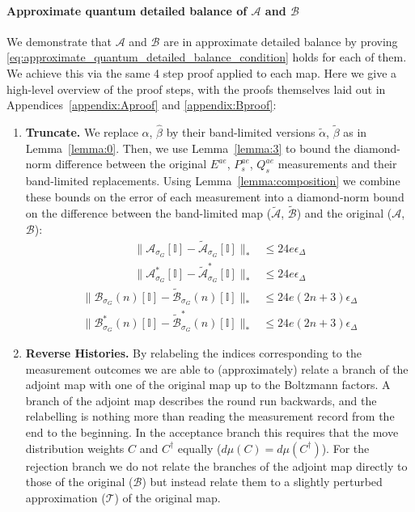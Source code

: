 \paragraph{Approximate quantum detailed balance of $\mathcal{A}$ and $\mathcal{B}$}
\label{section:proofbranchwisebalance}
We demonstrate that $\mathcal{A}$ and $\mathcal{B}$ are in approximate detailed balance by proving \eqref{eq:approximate_quantum_detailed_balance_condition} holds for each of them. We achieve this via the same 4 step proof applied to each map. Here we give a high-level overview of the proof steps, with the proofs themselves laid out in Appendices~\ref{appendix:Aproof} and \ref{appendix:Bproof}:
\begin{enumerate}
    \item \textbf{Truncate.} We replace $\hat \alpha$, $\hat \beta$ by their band-limited versions $\tilde \alpha$, $\tilde \beta$ as in Lemma~\ref{lemma:0}. Then, we use Lemma~\ref{lemma:3} to bound the diamond-norm difference between the original $E^{ae}$, $P_s^{ae}$, $Q_s^{ae}$ measurements and their band-limited replacements. Using Lemma~\ref{lemma:composition} we combine these bounds on the error of each measurement into a diamond-norm bound on the difference between the band-limited map ($\tilde{\mathcal{A}}$, $\tilde{\mathcal{B}}$) and the original ($\mathcal{A}$, $\mathcal{B}$):
        \begin{equation}
    \begin{aligned}
    \|\mathcal{A}_{\sigma_G}[\mathbb{I}] - \tilde{\mathcal{A}}_{\sigma_G}[\mathbb{I}]\|_*  &\leq 24e\epsilon_{\Delta}\\
    \|\mathcal{A}^*_{\sigma_G}[\mathbb{I}] - \tilde{\mathcal{A}}^*_{\sigma_G}[\mathbb{I}]\|_* &\leq 24e\epsilon_{\Delta}
    \end{aligned}
    \label{eq:suma1}
\end{equation}
    \begin{equation}
    \begin{aligned}
    \|\mathcal{B}_{\sigma_G}(n)[\mathbb{I}] - \tilde{\mathcal{B}}_{\sigma_G}(n)[\mathbb{I}]\|_* &\leq 24e(2n+3)\epsilon_{\Delta}
    \\ \|\mathcal{B}^*_{\sigma_G}(n)[\mathbb{I}] - \tilde{\mathcal{B}}^*_{\sigma_G}(n)[\mathbb{I}]\|_* &\leq 24e(2n+3)\epsilon_{\Delta}
    \end{aligned}
    \label{eq:sumb1}
\end{equation}
    \item \textbf{Reverse Histories.} By relabeling the indices corresponding to the measurement outcomes we are able to (approximately) relate a branch of the adjoint map with one of the original map up to the Boltzmann factors. A branch of the adjoint map describes the round run backwards, and the relabelling is nothing more than reading the measurement record from the end to the beginning. In the acceptance branch this requires that the move distribution weights $C$ and $C^{\dagger}$ equally ($d\mu(C) = d\mu(C^{\dagger})$). For the rejection branch we do not relate the branches of the adjoint map directly to those of the original ($\mathcal{B}$) but instead relate them to a slightly perturbed approximation ($\mathcal{T}$) of the original map.
    

\end{enumerate}
